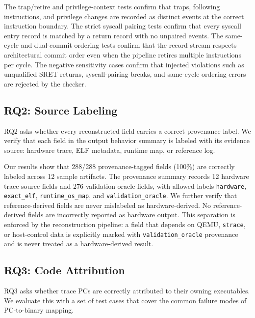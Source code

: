 The trap/retire and privilege-context tests confirm that traps, following
instructions, and privilege changes are recorded as distinct events at the
correct instruction boundary. The strict syscall pairing tests confirm that every
syscall entry record is matched by a return record with no unpaired events. The
same-cycle and dual-commit ordering tests confirm that the record stream respects
architectural commit order even when the pipeline retires multiple instructions
per cycle. The negative sensitivity cases confirm that injected violations such
as unqualified SRET returns, syscall-pairing breaks, and same-cycle ordering
errors are rejected by the checker.

\subsection{RQ2: Source Labeling}
\label{subsec:rq2-source-labeling}

RQ2 asks whether every reconstructed field carries a correct provenance label. We verify that each field in the output behavior summary is labeled with its evidence source: hardware trace, ELF metadata, runtime map, or reference log.

Our results show that 288/288 provenance-tagged fields (100\%) are correctly
labeled across 12 sample artifacts. The provenance summary records 12 hardware
trace-source fields and 276 validation-oracle fields, with allowed labels
\texttt{hardware}, \texttt{exact\_elf}, \texttt{runtime\_os\_map}, and
\texttt{validation\_oracle}. We further verify that reference-derived fields are
never mislabeled as hardware-derived. No reference-derived fields are incorrectly
reported as hardware output. This separation is enforced by the reconstruction
pipeline: a field that depends on QEMU, \texttt{strace}, or host-control data is
explicitly marked with \texttt{validation\_oracle} provenance and is never
treated as a hardware-derived result.

\subsection{RQ3: Code Attribution}
\label{subsec:rq3-code-attribution}

RQ3 asks whether trace PCs are correctly attributed to their owning executables. We evaluate this with a set of test cases that cover the common failure modes of PC-to-binary mapping.

